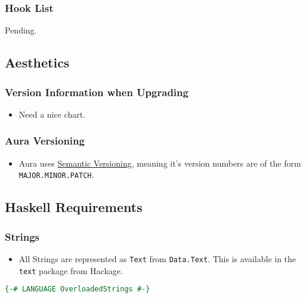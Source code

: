 \documentclass{article}
\begin{document}
\subsubsection{Hook List}\label{hook-list}

Pending.

\subsection{Aesthetics}\label{aesthetics}

\subsubsection{Version Information when
Upgrading}\label{version-information-when-upgrading}

\begin{itemize}
\itemsep1pt\parskip0pt
\item
  Need a nice chart.
\end{itemize}

\subsubsection{Aura Versioning}\label{aura-versioning}

\begin{itemize}
\itemsep1pt\parskip0pt
\item
  Aura uses \href{http://semver.org/}{Semantic Versioning}, meaning it's
  version numbers are of the form \texttt{MAJOR.MINOR.PATCH}.
\end{itemize}

\subsection{Haskell Requirements}\label{haskell-requirements}

\subsubsection{Strings}\label{strings}

\begin{itemize}
\itemsep1pt\parskip0pt
\item
  All Strings are represented as \texttt{Text} from \texttt{Data.Text}.
  This is available in the \texttt{text} package from Hackage.
\end{itemize}

\begin{shaded}
\begin{lstlisting}[language=haskell]
{-# LANGUAGE OverloadedStrings #-}
\end{lstlisting}
\end{shaded}
\end{document}
